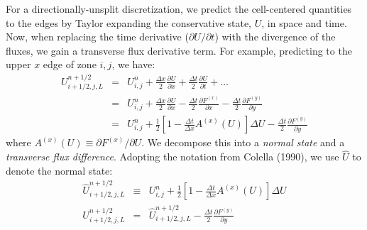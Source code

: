 For a directionally-unsplit discretization, we predict the
cell-centered quantities to the edges by Taylor expanding the
conservative state, $U$, in space and time.  Now, when replacing the
time derivative ($\partial U/\partial t$) with the divergence of the
fluxes, we gain a transverse flux derivative term.  For example,
predicting to the upper $x$ edge of zone $i,j$, we have:
\begin{eqnarray}
U_{i+1/2,j,L}^{n+1/2} &=& U_{i,j}^n + \frac{\Delta x}{2} \frac{\partial U}{\partial x} 
                            + \frac{\Delta t}{2} \frac{\partial U}{\partial t} + \ldots \\
&=& U_{i,j}^n + \frac{\Delta x}{2} \frac{\partial U}{\partial x} 
                            - \frac{\Delta t}{2} \frac{\partial F^{(x)}}{\partial x} 
                            - \frac{\Delta t}{2} \frac{\partial F^{(y)}}{\partial y} \\
&=& U_{i,j}^n + \frac{1}{2} \left [ 1 - \frac{\Delta t}{\Delta x} A^{(x)}(U) \right ] \Delta U 
                            - \frac{\Delta t}{2} \frac{\partial F^{(y)}}{\partial y} \label{eq:Utaylorstate}
\end{eqnarray}
where $A^{(x)}(U) \equiv \partial F^{(x)} / \partial U$.  We decompose
this into a {\em normal state} and a {\em transverse flux difference}.
Adopting the notation from Colella (1990), we use $\hat{U}$ to denote
the normal state:
\begin{eqnarray}
\hat{U}_{i+1/2,j,L}^{n+1/2} &\equiv& U_{i,j}^n 
      + \frac{1}{2} \left [ 1 - \frac{\Delta t}{\Delta x} A^{(x)}(U) \right ] \Delta U \\
U_{i+1/2,j,L}^{n+1/2} &=& \hat{U}_{i+1/2,j,L}^{n+1/2}
                            - \frac{\Delta t}{2} \frac{\partial F^{(y)}}{\partial y}  \label{eq:fullleftstate}
\end{eqnarray}

